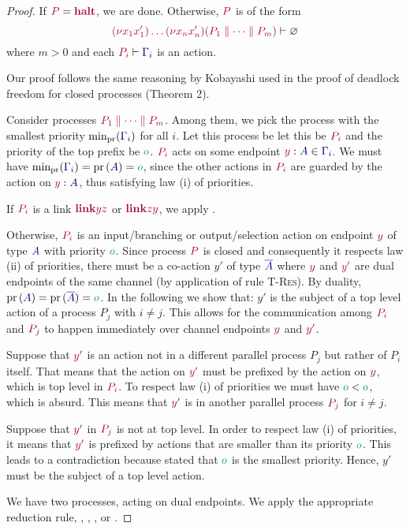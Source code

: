 \begin{proof}
  \label{prf:thm-pcp-closed-progress}
  If $\tm{P}=\tm{\halt}$, we are done. Otherwise, $\tm{P}$ is of the form
  \[
    \seq{\res{x_1}{x'_1}{\dots\res{x_n}{x'_n}{(P_1 \parallel\dots\parallel P_m)}}}{\emptyenv}
  \]
  where $m>0$ and each $\seq{P_i}{\ty{\Gamma_i}}$ is an action.

  Our proof follows the same reasoning by Kobayashi \cite{kobayashi2006} used in the proof of deadlock freedom for closed processes (Theorem 2). 

  Consider processes $\tm {P_1 \parallel\dots\parallel P_m}$. Among them, we pick the process with the smallest priority $\minpr{(\ty{\Gamma_i})}$ for all $i$. Let this process be let this be $\tm{P_i}$ and the priority of the top prefix be $\cs o$. $\tm{P_i}$ acts on some endpoint $\tmty{y}{A}\in\ty{\Gamma_i}$. We must have $\minpr{(\ty{\Gamma_i})}=\pr{(\ty{A})} = \cs o$, since the other actions in $\tm{P_i}$ are guarded by the action on $\tmty{y}{A}$, thus satisfying law (i) of priorities.

  If $\tm{P_i}$ is a link $\tm{\link{y}{z}}$ or $\tm{\link{z}{y}}$, we apply .

  Otherwise, $\tm{P_i}$ is an input/branching or output/selection action on endpoint $\tm y$ of type $\ty A$ with priority $\cs o$. Since process $\tm P$ is closed and consequently it respects law (ii) of priorities, there must be a co-action $y'$ of type $\ty{\co{A}}$  where $\tm{y}$ and $\tm{y'}$ are dual endpoints of the same channel (by application of rule \textsc{T-Res}). By duality, $\pr{(\ty{A})}=\pr{(\ty{\co{A}})}= \cs o$. In the following we show that: $y'$ is the subject of a top level action of a process $P_j$ with $i\neq j$. This allows for the communication among $\tm{P_i}$ and $\tm{P_j}$ to happen immediately over channel endpoints $\tm{y}$ and $\tm{y'}$.
  
  Suppose that $\tm{y'}$ is an action not in a different parallel process $P_j$ but rather of $P_i$ itself. That means that the action on $\tm{y'}$ must be prefixed by the action on $\tm{y}$, which is top level in $\tm{P_i}$. To respect law (i) of priorities we must have $\cs o < \cs o$, which is absurd. This means that $\tm{y'}$ is in another parallel process $\tm{P_j}$ for $i\neq j$.

  Suppose that $\tm{y'}$ in $\tm{P_j}$ is not at top level. In order to respect law (i) of priorities, it means that $\tm{y'}$ is prefixed by actions that are smaller than its priority $\cs o$. This leads to a contradiction because stated that $\cs o$ is the smallest priority. Hence, $y'$ must be the subject of a top level action.
  
  We have two processes, acting on dual endpoints. We apply the appropriate reduction rule, \ie {}, , , or .
\end{proof}

